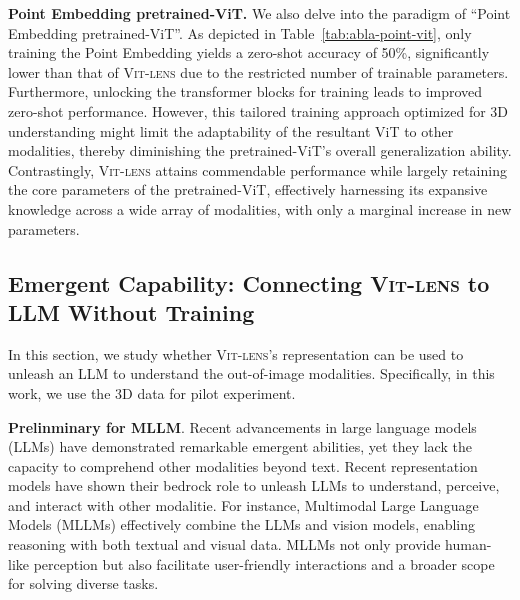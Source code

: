 \documentclass{article}
\newcommand{\ptvit}{pretrained-ViT\xspace}
\newcommand{\vit}{ViT\xspace}
\newcommand{\methodname}{{\scshape Vit-lens}\xspace}
\begin{document}
\textbf{Point Embedding  \ptvit.} We also delve into the paradigm of ``Point Embedding  \ptvit''. As depicted in Table~\ref{tab:abla-point-vit}, only training the Point Embedding yields a zero-shot accuracy of 50\%, significantly lower than that of \methodname due to the restricted number of trainable parameters. 
Furthermore, unlocking the transformer blocks for training leads to improved zero-shot performance. However, this tailored training approach optimized for 3D understanding might limit the adaptability of the resultant \vit to other modalities, thereby diminishing the \ptvit's overall generalization ability. 
Contrastingly, \methodname attains commendable performance while largely retaining the core parameters of the \ptvit, effectively harnessing its expansive knowledge across a wide array of modalities, with only a marginal increase in new parameters.

\subsection{Emergent Capability: Connecting \methodname to LLM Without Training}
In this section, we study whether \methodname's representation can be used to unleash an LLM to understand the out-of-image modalities. Specifically, in this work, we use the 3D data for pilot experiment.

\textbf{Prelinminary for MLLM}. Recent advancements in large language models (LLMs) have demonstrated remarkable emergent abilities, yet they lack the capacity to comprehend other modalities beyond text. Recent representation models have shown their bedrock role to unleash LLMs to understand, perceive, and interact with other modalitie. For instance, Multimodal Large Language Models (MLLMs) effectively combine the LLMs and vision models, enabling reasoning with both textual and visual data. MLLMs not only provide human-like perception but also facilitate user-friendly interactions and a broader scope for solving diverse tasks.
\end{document}
